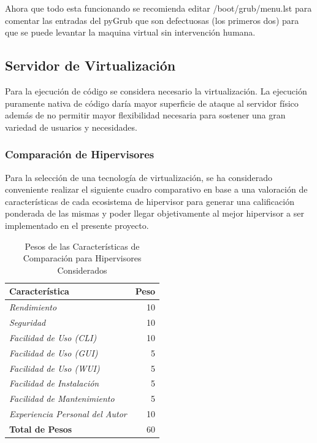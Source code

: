 Ahora que todo esta funcionando se recomienda editar /boot/grub/menu.lst para comentar las entradas del pyGrub que son defectuosas (los primeros dos) para que se puede levantar la maquina virtual sin intervención humana.

\subsection{Servidor de Virtualización}
Para la ejecución de código se considera necesario la virtualización. La ejecución puramente nativa de código daría mayor superficie de ataque al servidor físico además de no permitir mayor flexibilidad necesaria para sostener una gran variedad de usuarios y necesidades.

\subsubsection{Comparación de Hipervisores}
Para la selección de una tecnología de virtualización, se ha considerado conveniente realizar el siguiente cuadro comparativo en base a una valoración de características de cada ecosistema de hipervisor para generar una calificación ponderada de las mismas y poder llegar objetivamente al mejor hipervisor a ser implementado en el presente proyecto.

\begin{table}
	\centering
	\begin{tabular}{|l|r|}
    	\hline
		\textbf{Característica} & \textbf{Peso} \\
        \hline
        \textit{Rendimiento} & 10 \\
        \textit{Seguridad} & 10 \\
        \textit{Facilidad de Uso (CLI)} & 10 \\
        \textit{Facilidad de Uso (GUI)} & 5 \\
        \textit{Facilidad de Uso (WUI)} & 5 \\
        \textit{Facilidad de Instalación} & 5 \\
        \textit{Facilidad de Mantenimiento} & 5 \\
        \textit{Experiencia Personal del Autor} & 10 \\
        \hline
        \textbf{Total de Pesos} & 60 \\
        \hline
	\end{tabular}
    \caption{Pesos de las Características de Comparación para Hipervisores Considerados}
    \label{tab:hipervisor-compar-pesos}
\end{table}

